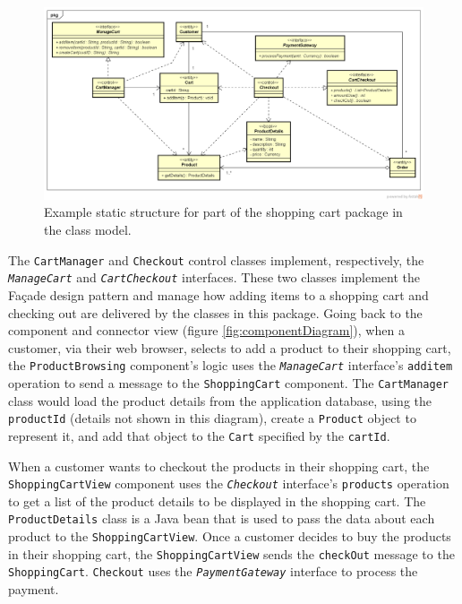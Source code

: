 \begin{figure}[h]
    \centering
    \begin{adjustwidth}{-10.5mm}{-11mm}
        \includegraphics[trim=23 53 23 43,clip,width=0.98\paperwidth]{images/uml/shopping_cart_class_diagram.png}
    \end{adjustwidth}
    \caption{Example static structure for part of the shopping cart package in the class model.}
    \label{fig:classDiagram}
\end{figure}

The \texttt{CartManager} and \texttt{Checkout} control classes implement, respectively, the \texttt{\textsl{ManageCart}} and \texttt{\textsl{Cart\-Check\-out}} interfaces.
These two classes implement the Façade design pattern and manage how adding items to a shopping cart and checking out are delivered by the classes in this package.
Going back to the component and connector view (figure \ref{fig:componentDiagram}),
when a customer, via their web browser, selects to add a product to their shopping cart,
the \texttt{ProductBrowsing} component's logic uses the \texttt{\textsl{ManageCart}} interface's \texttt{additem} operation to send a message to the \texttt{ShoppingCart} component.
The \texttt{CartManager} class would load the product details from the application database, using the \texttt{productId} (details not shown in this diagram),
create a \texttt{Product} object to represent it, and add that object to the \texttt{Cart} specified by the \texttt{cartId}.

\noindent
When a customer wants to checkout the products in their shopping cart, the \texttt{ShoppingCartView} component
uses the \texttt{\textsl{Checkout}} interface's \texttt{products} operation to get a list of the product details to be displayed in the shopping cart.
The \texttt{ProductDetails} class is a Java bean that is used to pass the data about each product to the \texttt{ShoppingCartView}.
Once a customer decides to buy the products in their shopping cart, the \texttt{ShoppingCartView} sends the \texttt{checkOut} message to the \texttt{ShoppingCart}.
\texttt{Checkout} uses the \texttt{\textsl{PaymentGateway}} interface to process the payment.

